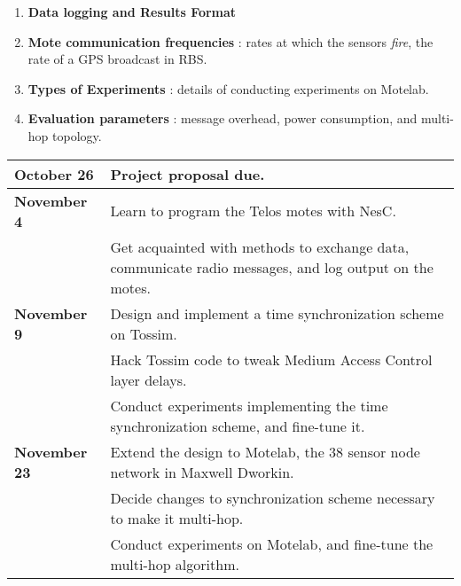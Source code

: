 \documentclass[8pt,twocolumn]{article}
\begin{document}
\begin{enumerate}\addtolength{\itemsep}{-0.5\baselineskip}
\item {\bf Data logging and Results Format}
\item {\bf Mote communication frequencies} : rates at which the sensors
\emph{fire}, the rate of a GPS broadcast in RBS.
\item {\bf Types of Experiments} : details of conducting experiments on
Motelab.  
\item {\bf Evaluation parameters} :  message overhead, power
consumption, and multi-hop topology. 
\end{enumerate}

\begin{table*}[t]
\begin{center}
\smaller\smaller
\begin{tabular}{|l|l|}
\hline
{\bf October 26} & Project proposal due.  \\
\hline
{\bf November 4} & Learn to program the Telos motes with NesC. \\
	& Get acquainted with methods to exchange data, communicate radio messages, and log output on the motes. \\
\hline
{\bf November 9} & Design and implement a time synchronization scheme on Tossim.\\
        & Hack Tossim code to tweak Medium Access Control layer delays. \\
        & Conduct experiments implementing the time synchronization scheme, and fine-tune it. \\
\hline
{\bf November 23} & Extend the design to Motelab, the 38 sensor node network in Maxwell Dworkin.\\
        & Decide changes to synchronization scheme necessary to make it multi-hop. \\
        & Conduct experiments on Motelab, and fine-tune the multi-hop algorithm.\\


\end{tabular}
\end{center}
\end{table*}
\end{document}
